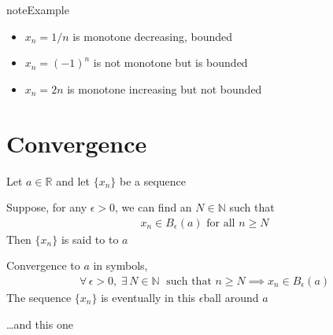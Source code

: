 \documentclass[letterpaper,10pt,english]{jupyterBook}
\begin{document}
\begin{sphinxadmonition}{note}{Example}
\begin{itemize}
\item {} 
\sphinxAtStartPar
\(x_n = 1/n\) is monotone decreasing, bounded

\item {} 
\sphinxAtStartPar
\(x_n = (-1)^n\) is not monotone but is bounded

\item {} 
\sphinxAtStartPar
\(x_n = 2n\) is monotone increasing but not bounded

\end{itemize}
\end{sphinxadmonition}


\section{Convergence}
\label{\detokenize{04.basic_analysis:convergence}}
\sphinxAtStartPar
Let \(a \in \mathbb{R}\) and let \(\{x_n\}\) be a sequence

\sphinxAtStartPar
Suppose, for any \(\epsilon > 0\), we can find an \(N \in \mathbb{N}\) such that
\begin{equation*}
\begin{split}
x_n \in B_\epsilon(a) \text{ for all } n \geq N
\end{split}
\end{equation*}
\sphinxAtStartPar
Then \(\{x_n\}\) is said to  to \(a\)

\sphinxAtStartPar
Convergence to \(a\) in symbols,
\begin{equation*}
\begin{split}
\forall \, \epsilon > 0, \;
\exists \, N \in \mathbb{N} \; 
\text{ such that } n \geq N \implies x_n \in B_{\epsilon}(a)
\end{split}
\end{equation*}
\sphinxAtStartPar
The sequence \(\{x_n\}\) is eventually in this \(\epsilon\)\sphinxhyphen{}ball around \(a\)

\begin{figure}[htbp]
\centering

\noindent{}
\end{figure}

\sphinxAtStartPar
…and this one

\begin{figure}[htbp]
\centering

\noindent{}
\end{figure}
\end{document}
